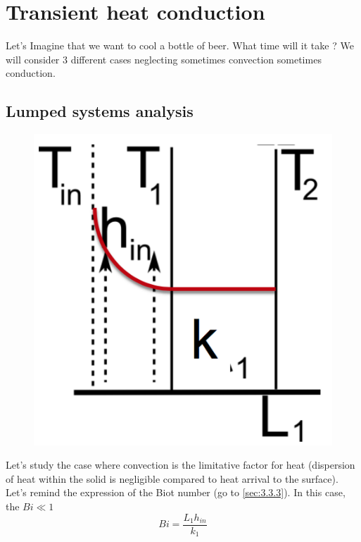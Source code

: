 
\chapter{Transient heat conduction}
	Let's Imagine that we want to cool a bottle of beer. What time will it take ? We will consider 3 different cases neglecting sometimes convection sometimes conduction. 
	
\section{Lumped systems analysis}
	\begin{figure}
	\vspace{-5mm}
	\includegraphics[scale=0.3]{ch3/8}
	\end{figure}	
	Let's study the case where convection is the limitative factor for heat (dispersion of heat within the solid is negligible compared to heat arrival to the surface). Let's remind the expression of the Biot number (go to \autoref{sec:3.3.3}). In this case, the $Bi \ll 1$
	\begin{equation}
		Bi = \frac{L_1h_{in}}{k_1}
	\end{equation}
	
